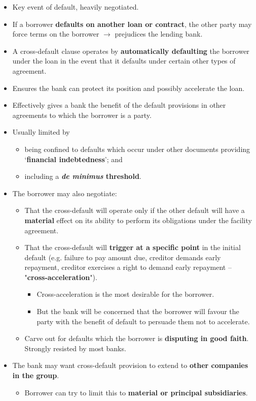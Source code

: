\documentclass[
]{article}
\providecommand{\tightlist}{%
  \setlength{\itemsep}{0pt}\setlength{\parskip}{0pt}}
\begin{document}
\begin{itemize}
\tightlist
\item
  Key event of default, heavily negotiated.
\item
  If a borrower \textbf{defaults on another loan or contract}, the other
  party may force terms on the borrower {\(\rightarrow\)} prejudices the
  lending bank.
\item
  A cross-default clause operates by \textbf{automatically defaulting}
  the borrower under the loan in the event that it defaults under
  certain other types of agreement.
\item
  Ensures the bank can protect its position and possibly accelerate the
  loan.
\item
  Effectively gives a bank the benefit of the default provisions in
  other agreements to which the borrower is a party.
\item
  Usually limited by

  \begin{itemize}
  \tightlist
  \item
    being confined to defaults which occur under other documents
    providing `\textbf{financial indebtedness}'; and
  \item
    including a \textbf{\emph{de minimus} threshold}.
  \end{itemize}
\item
  The borrower may also negotiate:

  \begin{itemize}
  \tightlist
  \item
    That the cross-default will operate only if the other default will
    have a \textbf{material} effect on its ability to perform its
    obligations under the facility agreement.
  \item
    That the cross-default will \textbf{trigger at a specific point} in
    the initial default (e.g. failure to pay amount due, creditor
    demands early repayment, creditor exercises a right to demand early
    repayment -- "\textbf{cross-acceleration}").

    \begin{itemize}
    \tightlist
    \item
      Cross-acceleration is the most desirable for the borrower.
    \item
      But the bank will be concerned that the borrower will favour the
      party with the benefit of default to persuade them not to
      accelerate.
    \end{itemize}
  \item
    Carve out for defaults which the borrower is \textbf{disputing in
    good faith}. Strongly resisted by most banks.
  \end{itemize}
\item
  The bank may want cross-default provision to extend to \textbf{other
  companies in the group}.

  \begin{itemize}
  \tightlist
  \item
    Borrower can try to limit this to \textbf{material or principal
    subsidiaries}.
  \end{itemize}
\end{itemize}
\end{document}
